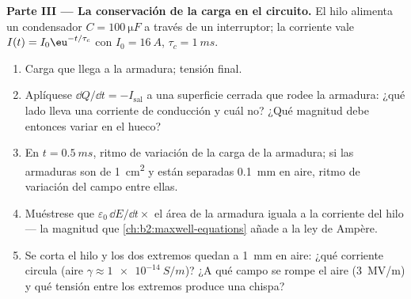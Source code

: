 \begin{problem}
\medskip
\noindent\textbf{Parte III --- La conservación de la carga en el circuito.}
El hilo alimenta un condensador $C = \qty{100}{\micro F}$ a través de un interruptor; la
corriente vale $I(t) = I_0\eu^{-t/\tau_c}$ con $I_0 = \qty{16}{A}$, $\tau_c = \qty{1}{ms}$.
\begin{enumerate}[resume]
  \item Carga que llega a la armadura; tensión final.
  \item Aplíquese $\dd Q/\dd t = -I_{\text{sal}}$ a una superficie cerrada
        que rodee la armadura: ¿qué lado lleva una corriente de conducción
        y cuál no? ¿Qué magnitud debe entonces variar en el hueco?
  \item En $t = \qty{0.5}{ms}$, ritmo de variación de la carga de la
        armadura; si las armaduras son de \qty{1}{cm^2} y están separadas
        \qty{0.1}{mm} en aire, ritmo de variación del campo entre ellas.
  \item Muéstrese que $\varepsilon_0\,\dd E/\dd t \times$ el área de la armadura
        iguala a la corriente del hilo --- la magnitud que
        \cref{ch:b2:maxwell-equations} añade a la ley de Ampère.
  \item Se corta el hilo y los dos extremos quedan a \qty{1}{mm} en aire:
        ¿qué corriente circula (aire $\gamma \approx \qty{1e-14}{S/m}$)? ¿A qué
        campo se rompe el aire (\qty{3}{MV/m}) y qué tensión entre los
        extremos produce una chispa?
\end{enumerate}


\end{problem}
